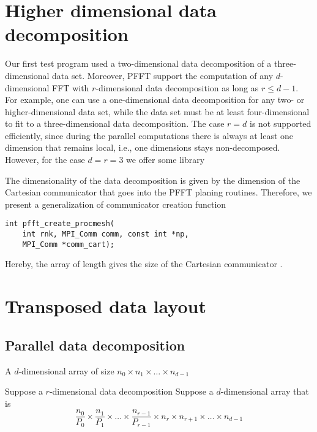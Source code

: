 \section{Higher dimensional data decomposition}
Our first test program used a two-dimensional data decomposition of a three-dimensional data set.
Moreover, PFFT support the computation of any $d$-dimensional FFT with $r$-dimensional data decomposition
as long as $r\le d-1$. For example, one can use a one-dimensional data decomposition for any two- or higher-dimensional data set,
while the data set must be at least four-dimensional to fit to a three-dimensional data decomposition.
The case $r=d$ is not supported efficiently, since during the parallel computations
there is always at least one dimension that remains local, i.e., one dimensions stays non-decomposed.
However, for the case $d=r=3$ we offer some library

The dimensionality of the data decomposition is given by the dimension of the Cartesian communicator that
goes into the PFFT planing routines. Therefore, we present a generalization of communicator creation function
\begin{lstlisting}
int pfft_create_procmesh(
    int rnk, MPI_Comm comm, const int *np,
    MPI_Comm *comm_cart);
\end{lstlisting}
Hereby, the array  of length  gives the size of the Cartesian communicator .


\section{Transposed data layout}
\begin{compactitem}
  \item {}
  \item {}
  \item {}
\end{compactitem}

\subsection{Parallel data decomposition}

A $d$-dimensional array of size $n_0 \times n_1\times \hdots \times n_{d-1}$ 

Suppose a $r$-dimensional data decomposition
Suppose a $d$-dimensional array that is 
\begin{equation*}
  \frac{n_0}{P_0} \times \frac{n_1}{P_1} \times \hdots \times \frac{n_{r-1}}{P_{r-1}}  \times n_r \times n_{r+1} \times \hdots \times n_{d-1}
\end{equation*}



